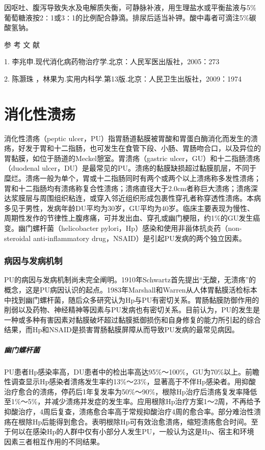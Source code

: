 因呕吐、腹泻导致失水及电解质失衡，可静脉补液，用生理盐水或平衡盐液与5\%葡萄糖液按2∶1或3∶1的比例配合静滴。排尿后适当补钾。酸中毒者可滴注5\%碳酸氢钠。\protect\hypertarget{text00317.html}{}{}

\hypertarget{text00317.htmlux5cux23CHP11-1-4}{}
参 考 文 献

1. 李兆申.现代消化病药物治疗学.北京：人民军医出版社，2005：273

2. 陈灏珠 ，林果为.实用内科学.第13版.北京：人民卫生出版社，2009：1974

\protect\hypertarget{text00318.html}{}{}

\chapter{消化性溃疡}

消化性溃疡（peptic
ulcer，PU）指胃肠道黏膜被胃酸和胃蛋白酶消化而发生的溃疡，好发于胃和十二指肠，也可发生在食管下段、小肠、胃肠吻合口，以及异位的胃黏膜，如位于肠道的Meckel憩室。胃溃疡（gastric
ulcer，GU）和十二指肠溃疡（duodenal
ulcer，DU）是最常见的PU。溃疡的黏膜缺损超过黏膜肌层，不同于糜烂。溃疡一般为单个，胃或十二指肠同时有两个或两个以上溃疡称多发性溃疡；胃和十二指肠均有溃疡称复合性溃疡；溃疡直径大于2.0cm者称巨大溃疡；溃疡深达浆膜层与周围组织粘连，或穿入邻近组织形成包裹性穿孔者称穿透性溃疡。本病多见于男性，发病年龄DU平均为30岁，GU平均为40岁。临床主要表现为慢性、周期性发作的节律性上腹疼痛，可并发出血、穿孔或幽门梗阻，约1\%的GU发生癌变。幽门螺杆菌（helicobacter
pylori，Hp）感染和使用非甾体抗炎药（non-steroidal anti-inflammatory
drug，NSAID）是引起PU发病的两个独立因素。

\subsection{病因与发病机制}

PU的病因与发病机制尚未完全阐明。1910年Schwartz首先提出“无酸，无溃疡”的概念，这是PU病因认识的起点。1983年Marshall和Warren从人体胃黏膜活检标本中找到幽门螺杆菌，随后众多研究认为Hp与PU有密切关系。胃肠黏膜防御作用的削弱以及药物、神经精神等因素与PU发病也有密切关系。目前认为，PU的发生是一种或多种有害因素对黏膜破坏超过黏膜抵御损伤和自身修复的能力所引起的综合结果，而Hp和NSAID是损害胃肠黏膜屏障从而导致PU发病的最常见病因。

\paragraph{幽门螺杆菌}

PU患者Hp感染率高，DU患者中的检出率高达95\%～100\%，GU为70\%以上。前瞻性调查显示Hp感染者溃疡发生率约13\%～23\%，显著高于不伴Hp感染者。用抑酸治疗愈合的溃疡，停药后1年复发率为50\%～90\%，根除Hp治疗后溃疡复发率降低至1\%～5\%，并减少溃疡并发症的发生率。应用根除Hp治疗方案1～2周，不再给予抑酸治疗，4周后复查，溃疡愈合率高于常规抑酸治疗4周的愈合率。部分难治性溃疡在根除Hp后能得到愈合。表明根除Hp可有效治愈溃疡，缩短溃疡愈合时间。至于何以在感染Hp的人群中仅有小部分人发生PU，一般认为这是Hp、宿主和环境因素三者相互作用的不同结果。

